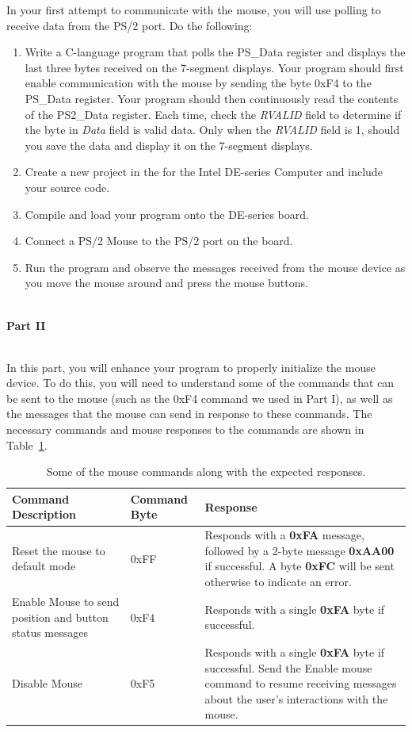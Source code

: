 \documentclass[epsfig,10pt,fullpage]{article}
\begin{document}
In your first attempt to communicate with the mouse, you will use polling to receive data from the PS/2 port. Do the following:
\begin{enumerate}
	\item Write a C-language program that polls the {\sf PS\_Data} register and displays the last three bytes received on the 7-segment displays. Your program should first enable communication with the mouse by sending the byte {\sf 0xF4} to the {\sf PS\_Data} register. Your program should then continuously read the contents of the {\sf PS2\_Data} register. Each time, check the {\it RVALID} field to determine if the byte in {\it Data} field is valid data. Only when the {\it RVALID} field is 1, should you save the data and display it on the 7-segment displays.
	\item Create a new project in the \productNameMedTM{} for the Intel DE-series Computer and include your source code.
	\item Compile and load your program onto the DE-series board.
	\item Connect a PS/2 Mouse to the PS/2 port on the board.
	\item Run the program and observe the messages received from the mouse device as you move the mouse around and press the mouse buttons.
\end{enumerate}

~\\
\noindent
{\bf Part II}

~\\
\noindent
In this part, you will enhance your program to properly initialize the mouse device. To do this, you will need to understand
some of the commands that can be sent to the mouse (such as the {\sf 0xF4} command we used in Part I), as well as the messages that the mouse can send in response to these commands. The necessary commands and mouse responses to the commands are shown in Table~\ref{tab:mouse_commands}.

\begin{table}[h]
	\caption{Some of the mouse commands along with the expected responses.}
	\begin{center}
	\begin{tabular}{|p{5.5 cm}|p{2 cm}|p{7 cm}|}
	\hline
	\textbf{Command Description} &
	\textbf{Command Byte} &
	\textbf{Response}
	\\\hline
	Reset the mouse to default mode &
	0xFF &
	Responds with a {\bf 0xFA} message, followed by a 2-byte message {\bf 0xAA00} if successful. A byte {\bf 0xFC} will be sent otherwise to indicate an error.
	\\\hline
	Enable Mouse to send position and button status messages &
	0xF4 &
	Responds with a single {\bf 0xFA} byte if successful.
	\\\hline
	Disable Mouse &
	0xF5 &
	Responds with a single {\bf 0xFA} byte if successful. Send the Enable mouse command to resume
	receiving messages about the user's interactions with the mouse.
	\\\hline
	\end{tabular}
	\end{center}
	\label{tab:mouse_commands}
\end{table}
\end{document}
